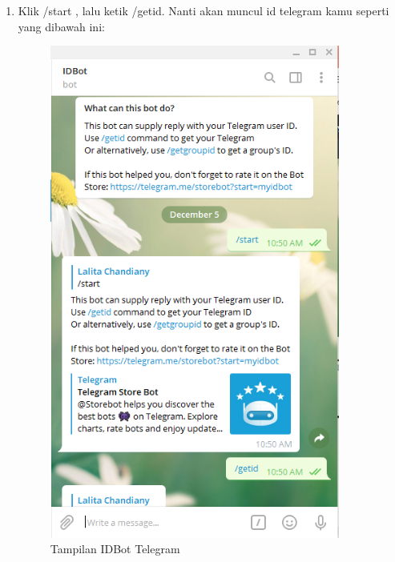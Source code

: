 \begin{enumerate}
\begin{enumerate}
    \item Klik /start , lalu ketik /getid. Nanti akan muncul id telegram kamu seperti yang dibawah ini:
    \begin{figure}[H]
    \centering
    \includegraphics[width=0.9\textwidth]{figures/bot6.png}
    \caption{Tampilan IDBot Telegram}
    \label{print}
    \end{figure}
        

\end{enumerate}
\end{enumerate}
